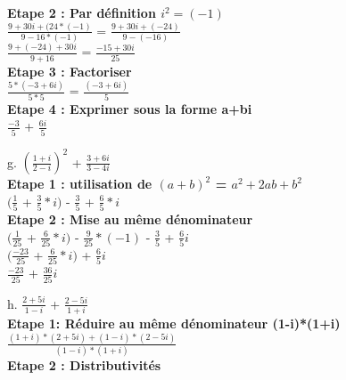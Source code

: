 \textbf{Etape 2 : Par définition $i^{2} = (-1)$} \\

$\frac{9+30i+(24*(-1)}{9-16*(-1)}$  = $\frac{9+30i+(-24)}{9-(-16)}$ \\

$\frac{9+(-24)+30i}{9+16}$  = $\frac{-15+30i}{25}$ \\

\textbf{Etape 3 : Factoriser} \\

$\frac{5*(-3+6i)}{5*5}$ = $\frac{(-3+6i)}{5}$ \\

\textbf{Etape 4 : Exprimer sous la forme a+bi} \\

$\frac{-3}{5}$ + $\frac{6i}{5}$ \\

\newpage

g. $(\frac{1+i}{2-i})^{2}$ + $\frac{3+6i}{3-4i}$ \\

\textbf{Etape 1 : utilisation de $(a+b)^{2}$ = $a^{2}+2ab+b^{2}$} \\

$(\frac{1}{5}$ + $\frac{3}{5}*i)$ - $\frac{3}{5}$ + $\frac{6}{5}*i$ \\

\textbf{Etape 2 : Mise au même dénominateur} \\

$(\frac{1}{25}$ + $\frac{6}{25}*i)$ - $\frac{9}{25}*(-1)$ - $\frac{3}{5}$ + $\frac{6}{5}i$ \\

$(\frac{-23}{25}$ + $\frac{6}{25}*i)$ + $\frac{6}{5}i$ \\

$\frac{-23}{25}$ + $\frac{36}{25}i$ \\

\vspace{5mm} %

h. $\frac{2+5i}{1-i}$ + $\frac{2-5i}{1+i}$ \\

\textbf{Etape 1: Réduire au même dénominateur (1-i)*(1+i)} \\

$\frac{(1+i) * (2+5i) + (1-i) * (2-5i)}{ (1-i) * (1+i) }$ \\

\textbf{Etape 2 : Distributivités} \\


